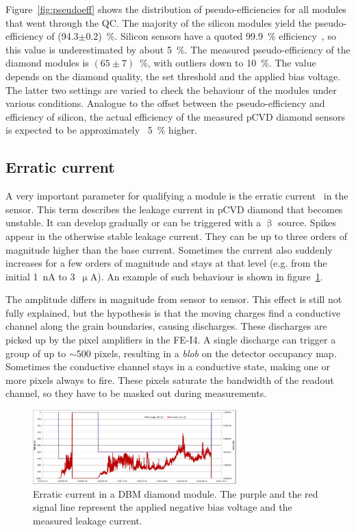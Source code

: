 Figure~\ref{fig:pseudoeff} shows the distribution of pseudo-efficiencies for all modules that went through the QC. The majority of the silicon modules yield the pseudo-efficiency of (94.3$\pm$0.2)~\%. Silicon sensors have a quoted 99.9~\% efficiency~\cite{1748-0221-7-11-P11010}, so this value is underestimated by about 5~\%. The measured pseudo-efficiency of the diamond modules is $(65\pm7)$~\%, with outliers down to 10~\%. The value depends on the diamond quality, the set threshold and the applied bias voltage. The latter two settings are varied to check the behaviour of the modules under various conditions. Analogue to the offset between the pseudo-efficiency and efficiency of silicon, the actual efficiency of the measured pCVD diamond sensors is expected to be approximately ~5~\% higher.

\subsection{Erratic current}
A very important parameter for qualifying a module is the erratic current~\cite{Mueller:1175553} in the sensor. This term describes the leakage current in pCVD diamond that becomes unstable. It can develop gradually or can be triggered with a $\upbeta$ source. Spikes appear in the otherwise stable leakage current. They can be up to three orders of magnitude higher than the base current. Sometimes the current also suddenly increases for a few orders of magnitude and stays at that level (e.g. from the initial 1~nA to 3~$\upmu$A). An example of such behaviour is shown in figure~\ref{fig:erratic1}. 

The amplitude differs in magnitude from sensor to sensor. This effect is still not fully explained, but the hypothesis is that the moving charges find a conductive channel along the grain boundaries, causing discharges. These discharges are picked up by the pixel amplifiers in the FE-I4. A single discharge can trigger a group of up to $\sim$500 pixels, resulting in a \emph{blob} on the detector occupancy map. Sometimes the conductive channel stays in a conductive state, making one or more pixels always to fire. These pixels saturate the bandwidth of the readout channel, so they have to be masked out during measurements. 

\begin{figure}[!t]
\centering
\includegraphics[width=0.7\textwidth]{04_charge_monitoring/pics/erratic1} 
\caption{Erratic current in a DBM diamond module. The purple and the red signal line represent the applied negative bias voltage and the measured leakage current.}
\label{fig:erratic1}
\end{figure}

